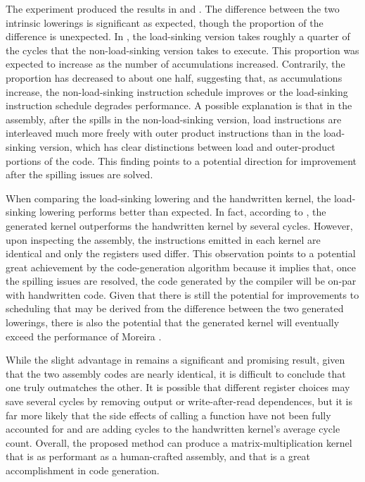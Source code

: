 \documentclass[\main/thesis.tex]{subfiles}
\begin{document}
The experiment produced the results in  and .
The difference between the two intrinsic \glspl{lowering} is significant as expected, though the proportion of the difference is unexpected.
In , the load-sinking version takes roughly a quarter of the cycles that the non-load-sinking version takes to execute.
This proportion was expected to increase as the number of accumulations increased.
Contrarily, the proportion has decreased to about one half, suggesting that, as accumulations increase, the non-load-sinking instruction schedule improves or the load-sinking instruction schedule degrades performance.
A possible explanation is that in the assembly, after the spills in the non-load-sinking version, load instructions are interleaved much more freely with outer product instructions than in the load-sinking version, which has clear distinctions between load and outer-product portions of the code.
This finding points to a potential direction for improvement after the spilling issues are solved.

When comparing the load-sinking \gls{lowering} and the handwritten kernel, the load-sinking \gls{lowering} performs better than expected.
In fact, according to , the generated kernel outperforms the handwritten kernel by several cycles.
However, upon inspecting the assembly, the instructions emitted in each kernel are identical and only the registers used differ.
This observation points to a potential great achievement by the code-generation algorithm because it implies that, once the spilling issues are resolved, the code generated by the compiler will be on-par with handwritten code.
Given that there is still the potential for improvements to scheduling that may be derived from the difference between the two generated \glspl{lowering}, there is also the potential that the generated kernel will eventually exceed the performance of Moreira \etal.

While the slight advantage in  remains a significant and promising result, given that the two assembly codes are nearly identical, it is difficult to conclude that one truly outmatches the other.
It is possible that different register choices may save several cycles by removing output or write-after-read dependences, but it is far more likely that the side effects of calling a function have not been fully accounted for and are adding cycles to the handwritten kernel's average cycle count.
Overall, the proposed method can produce a matrix-multiplication kernel that is as performant as a human-crafted assembly, and that is a great accomplishment in code generation.
\end{document}
